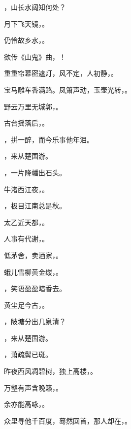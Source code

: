 \documentclass[12pt, a4paper, addpoints]{exam}
\begin{document}
\begin{questions}
\question[1] \uline{\qquad\qquad\qquad}，山长水阔知何处？

\question[1] 月下飞天镜，\uline{\qquad\qquad\qquad}。

\question[1] 仍怜故乡水，\uline{\qquad\qquad\qquad}。

\question[1] 欲传《山鬼》曲，\uline{\qquad\qquad\qquad}！

\question[1] 重重帘幕密遮灯，风不定，人初静，\uline{\qquad\qquad\qquad}。

\question[1] 宝马雕车香满路。凤箫声动，玉壶光转，\uline{\qquad\qquad\qquad}。

\question[1] 野云万里无城郭，\uline{\qquad\qquad\qquad}。

\question[1] 古台摇落后，\uline{\qquad\qquad\qquad}。

\question[1] \uline{\qquad\qquad\qquad}，拼一醉，而今乐事他年泪。

\question[1] \uline{\qquad\qquad\qquad}，来从楚国游。

\question[1] \uline{\qquad\qquad\qquad}，一片降幡出石头。

\question[1] 牛渚西江夜，\uline{\qquad\qquad\qquad}。

\question[1] \uline{\qquad\qquad\qquad}，极目江南总是秋。

\question[1] 太乙近天都，\uline{\qquad\qquad\qquad}。

\question[1] 人事有代谢，\uline{\qquad\qquad\qquad}。

\question[1] 低茅舍，卖酒家，\uline{\qquad\qquad\qquad}。

\question[1] 蛾儿雪柳黄金缕，\uline{\qquad\qquad\qquad}。

\question[1] \uline{\qquad\qquad\qquad}，笑语盈盈暗香去。

\question[1] 黄尘足今古，\uline{\qquad\qquad\qquad}。

\question[1] \uline{\qquad\qquad\qquad}，陂塘分出几泉清？

\question[1] \uline{\qquad\qquad\qquad}，来从楚国游。

\question[1] \uline{\qquad\qquad\qquad}，萧疏鬓已斑。

\question[1] 昨夜西风凋碧树，独上高楼，\uline{\qquad\qquad\qquad}。

\question[1] 万壑有声含晚籁，\uline{\qquad\qquad\qquad}。

\question[1] 余亦能高咏，\uline{\qquad\qquad\qquad}。

\question[1] 众里寻他千百度，蓦然回首，那人却在，\uline{\qquad\qquad\qquad}。


\end{questions}
\end{document}
